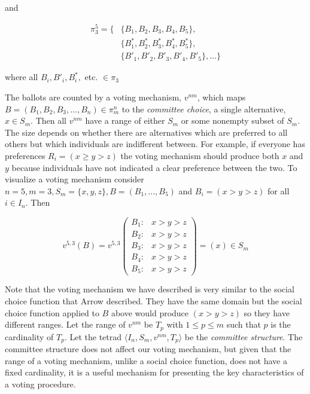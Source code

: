 \documentclass{amsart}
\theoremstyle{plain}
\begin{document}
\noindent and

\begin{center}

\begin{align*}
    \pi_3^5 = \{ &\{B_1, B_2, B_3, B_4, B_5\}, \\
    & \{B_1^*, B_2^*, B_3^*, B_4^*, B_5^*\}, \\
    & \{B'_1, B'_2, B'_3, B'_4, B'_5\}, ...\}
\end{align*}
    
\end{center}

\noindent where all $B_i, B'_i, B^*_i,$ etc. $\in \pi_3$

\vskip 0.5cm

The ballots are counted by a voting mechanism, $v^{nm}$, which maps $B = (B_1, B_2, B_3, ... , B_n) \in \pi_m^n$ to the \emph{committee choice}, a single alternative, $x \in S_m$. Then all $v^{nm}$ have a range of either $S_m$ or some nonempty subset of $S_m$. The size depends on whether there are alternatives which are preferred to all others but which individuals are indifferent between. For example, if everyone has preferences $R_i = (x \ge y > z)$ the voting mechanism should produce both $x$ and $y$ because individuals have not indicated a clear preference between the two. To visualize a voting mechanism consider $n = 5, m = 3, S_m = \{x,y,z\}, B = (B_1, ... , B_5)$ and $B_i = (x > y > z)$ for all $i \in I_n$. Then 

\begin{equation*}
  v^{5,3}(B) = v^{5,3}\left(
    \begin{array}{cc}
      B_1: & \text{$x > y > z$}\\
      B_2: & \text{$x > y > z$}\\
      B_3: & \text{$x > y > z$}\\
      B_4: & \text{$x > y > z$}\\ 
      B_5: & \text{$x > y > z$}
    \end{array} 
    \right) = (x) \in S_m
\end{equation*}

\vskip 0.5cm

Note that the voting mechanism we have described is very similar to the social choice function that Arrow described. They have the same domain but the social choice function applied to $B$ above would produce $(x > y > z)$ so they have different ranges. Let the range of $v^{nm}$ be $T_p$ with $1 \le p \le m$ such that $p$ is the cardinality of $T_p$. Let the tetrad $\langle I_n, S_m, v^{nm}, T_p \rangle$ be the \emph{committee structure}. The committee structure does not affect our voting mechanism, but given that the range of a voting mechanism, unlike a social choice function, does not have a fixed cardinality, it is a useful mechanism for presenting the key characteristics of a voting procedure. 
\end{document}
